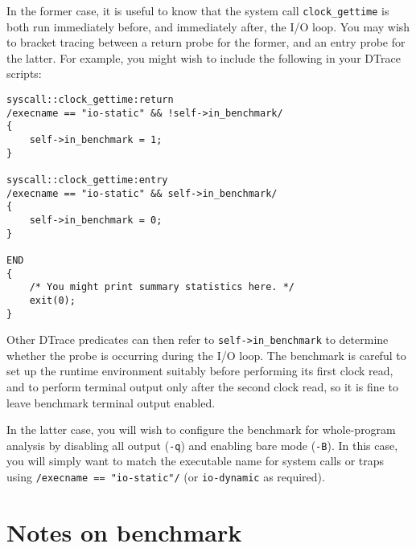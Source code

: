 \documentclass[a4paper,10pt]{article}
\begin{document}
In the former case, it is useful to know that the system call
\texttt{clock\_gettime} is both run immediately before, and immediately after,
the I/O loop.
You may wish to bracket tracing between a return probe for the former, and an
entry probe for the latter.
For example, you might wish to include the following in your DTrace scripts:

\begin{verbatim}
syscall::clock_gettime:return
/execname == "io-static" && !self->in_benchmark/
{
    self->in_benchmark = 1;
}

syscall::clock_gettime:entry
/execname == "io-static" && self->in_benchmark/
{
    self->in_benchmark = 0;
}

END
{
    /* You might print summary statistics here. */
    exit(0);
}
\end{verbatim}

\noindent
Other DTrace predicates can then refer to \texttt{self->in\_benchmark} to
determine whether the probe is occurring during the I/O loop.
The benchmark is careful to set up the runtime environment suitably before
performing its first clock read, and to perform terminal output only after the
second clock read, so it is fine to leave benchmark terminal output enabled.

In the latter case, you will wish to configure the benchmark for whole-program
analysis by disabling all output (\texttt{-q}) and enabling bare mode
(\texttt{-B}).
In this case, you will simply want to match the executable name for system
calls or traps using \texttt{/execname == "io-static"/} (or
\texttt{io-dynamic} as required).



\section*{Notes on benchmark}
\end{document}

